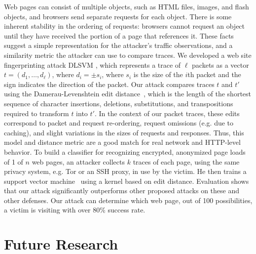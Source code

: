 \documentclass[11pt,oneside]{article}
\begin{document}
Web pages can consist of multiple objects, such as HTML files, images, and flash objects, and browsers send separate requests for each object. There is some inherent stability in the ordering of requests: browsers cannot request an object until they have received the portion of a page that references it. These facts suggest a simple representation for the attacker's traffic observations, and a similarity metric the attacker can use to compare traces.  We developed a web site fingerprinting attack DLSVM \cite{cai-ccs12}, which represents a trace of $\ell$ packets as a vector $t=(d_1, \ldots, d_\ell)$, where $d_i=\pm s_i$, where $s_i$ is the size of the $i$th packet and the sign indicates the direction of the packet.  Our attack compares traces $t$ and $t'$ using the Damerau-Levenshtein edit distance~\cite{navarro-acmcs01}, which is the length of the shortest sequence of character insertions, deletions, substitutions, and transpositions required to transform $t$ into $t'$. In the context of our packet traces, these edits correspond to packet and request re-ordering, request omissions (e.g. due to caching), and slight variations in the sizes of requests and responses. Thus, this model and distance metric are a good match for real network and HTTP-level behavior. To build a classifier for recognizing encrypted, anonymized page loads
of 1 of $n$ web pages, an attacker collects $k$ traces of each page,
using the same privacy system, e.g. Tor or an SSH proxy, in use by the
victim.  He then trains a support vector machine~\cite{vapnik-svm95}
using a kernel based on edit distance. Evaluation shows that our attack significantly outperforms other proposed attacks on these
and other defenses. Our attack can determine which web page, out of 100 possibilities, a victim is visiting with
over 80\% success rate.



\section{Future Research}




\end{document}
